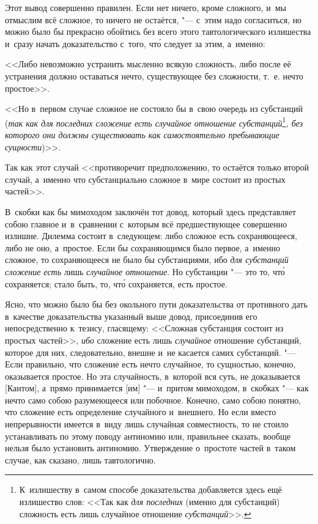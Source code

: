 Этот вывод совершенно правилен. Если нет ничего, кроме сложного, и~мы
отмыслим всё сложное, то ничего не остаётся, "--- с~этим надо согласиться, но
можно было бы прекрасно обойтись без всего этого тавтологического излишества
и~сразу начать доказательство с~того, чт\'{о} следует за этим, а~именно:

<<Либо невозможно устранить мысленно всякую сложность, либо после её устранения
должно оставаться нечто, существующее без сложности, т.~е. нечто простое>>.

<<Но в~первом случае сложное не состояло бы в~свою очередь из субстанций
({\em так как для последних сложение есть случайное
отношение субстанций}\footnote{К~излишеству в~самом способе
доказательства добавляется здесь ещё излишество слов: <<Так как
{\em для последних} (именно для субстанций) сложность есть лишь случайное
отношение {\em субстанций}>>.}{\em , без которого они должны
существовать как самостоятельно пребывающие сущности})>>.

Так как этот случай <<противоречит предположению, то остаётся
только второй случай, а~именно что субстанциально
сложное в~мире состоит из простых частей>>.

В~скобки как бы мимоходом заключён тот довод, который здесь представляет
собою главное и~в~сравнении с~которым всё предшествующее совершенно излишне.
Дилемма состоит в~следующем: либо сложное есть сохраняющееся, либо не оно,
а~простое. Если бы сохраняющимся было первое, а~именно сложное,
то сохраняющееся не было бы субстанциями, ибо {\em для субстанций
сложение есть} лишь {\em случайное отношение}. Но субстанции "--- это то,
чт\'{о} сохраняется; стало быть, то, чт\'{о} сохраняется, есть простое.

Ясно, что можно было бы без окольного пути доказательства от противного дать
в~качестве доказательства указанный выше довод, присоединив его
непосредственно к~тезису, гласящему: <<Сложная субстанция состоит из простых
частей>>, {\em ибо} сложение есть лишь {\em случайное} отношение субстанций,
которое для них, следовательно, внешне и~не касается самих субстанций. "---
Если правильно, что сложение есть нечто случайное, то сущностью, конечно,
оказывается простое. Но эта случайность, в~которой вся суть, не доказывается
[Кантом], а~прямо принимается [им] "--- и~притом мимоходом, в~скобках "--- как
нечто само собою разумеющееся или побочное. Конечно, само собою понятно, что
сложение есть определение случайного и~внешнего. Но если вместо непрерывности
имеется в~виду лишь случайная совместность, то не стоило устанавливать
по этому поводу антиномию или, правильнее сказать, вообще нельзя было
установить антиномию. Утверждение о~простоте частей в~таком случае,
как сказано, лишь тавтологично.

